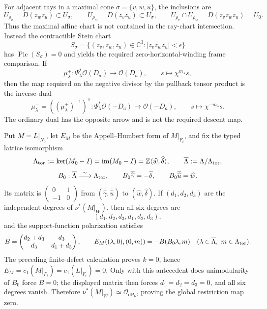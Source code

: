 {\ResultSmall
For adjacent rays in a maximal cone \(\sigma=\{v,w,u\}\), the inclusions are
\[
 U_{\rho_v}=D(z_wz_u)\subset U_\sigma,\qquad
 U_{\rho_w}=D(z_vz_u)\subset U_\sigma,
 \qquad U_{\rho_v}\cap U_{\rho_w}=D(z_vz_wz_u)=U_0.
\]
Thus the maximal affine chart is not contained in the ray-chart
intersection.  Instead the contractible Stein chart
\[
 S_\sigma=\{(z_v,z_w,z_u)\in\mathbb C^3:
 |z_vz_wz_u|<\epsilon\}
\]
has \(\operatorname{Pic}(S_\sigma)=0\) and yields the required
zero-horizontal-winding frame comparison.  If
\[
 \mu_\lambda^+:\Psi_\lambda^*\mathcal O(D_a)
 \longrightarrow\mathcal O(D_a),\qquad
 s\longmapsto\chi^{m_\lambda}s,
\]
then the map required on the negative divisor by the pullback tensor product
is the inverse-dual
\[
 \mu_\lambda^-=((\mu_\lambda^+)^{-1})^\vee:
 \Psi_\lambda^*\mathcal O(-D_a)\longrightarrow\mathcal O(-D_a),
 \qquad s\longmapsto\chi^{-m_\lambda}s.
\]
The ordinary dual has the opposite arrow and is not the required descent
map.
}

{\ResultSmall
Put \(M=L|_{N_0}\), let \(E_M\) be the Appell--Humbert form of
\(M|_{F_t}\), and fix the typed lattice isomorphism
\[
 \Lambda_{\rm tor}:=\ker(M_0-I)=\operatorname{im}(M_0-I)
 =\mathbb Z\langle\widehat w,\widehat\delta\rangle,
 \qquad \overline\Lambda:=\Lambda/\Lambda_{\rm tor},
\]
\[
 B_0:\overline\Lambda\xrightarrow{\ \sim\ }\Lambda_{\rm tor},
 \qquad
 B_0\overline{\widehat\gamma}=-\widehat\delta,\qquad
 B_0\overline{\widehat u}=\widehat w.
\]
Its matrix is
\(\left(\begin{smallmatrix}0&1\\-1&0\end{smallmatrix}\right)\)
from \((\overline{\widehat\gamma},\overline{\widehat u})\) to
\((\widehat w,\widehat\delta)\).
If \((d_1,d_2,d_3)\) are the independent degrees of
\(\nu^*(M|_W)\), then all six degrees are
\[
 (d_1,d_2,d_3,d_1,d_2,d_3),
\]
and the support-function polarization satisfies
\[
 B=\begin{pmatrix}d_2+d_3&d_3\\d_3&d_1+d_3\end{pmatrix},
 \qquad
 E_M((\lambda,0),(0,m))=-B(B_0\lambda,m)
 \quad(\lambda\in\overline\Lambda,\ m\in\Lambda_{\rm tor}).
\]
The preceding finite-defect calculation proves \(k=0\), hence
\(E_M=c_1(M|_{F_t})=c_1(L|_{F_t})=0\).  Only with this antecedent does
unimodularity of
\(B_0\) force \(B=0\); the displayed matrix then forces
\(d_1=d_2=d_3=0\), and all six degrees vanish.  Therefore
\(\nu^*(M|_W)\simeq\mathcal O_{\mathrm{dP}_6}\), proving the global
restriction map zero.
}

